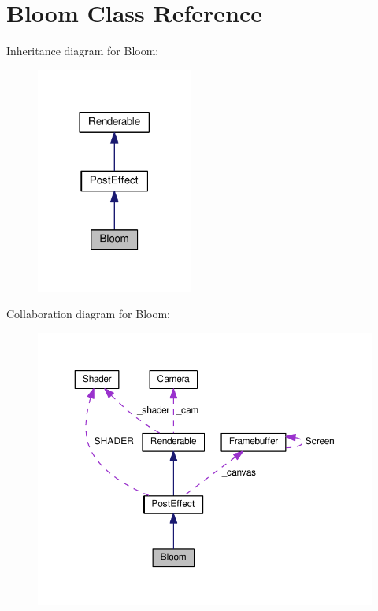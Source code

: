 \hypertarget{class_bloom}{}\section{Bloom Class Reference}
\label{class_bloom}


Inheritance diagram for Bloom\+:\nopagebreak
\begin{figure}[H]
\begin{center}
\leavevmode
\includegraphics[width=146pt]{class_bloom__inherit__graph}
\end{center}
\end{figure}


Collaboration diagram for Bloom\+:\nopagebreak
\begin{figure}[H]
\begin{center}
\leavevmode
\includegraphics[width=350pt]{class_bloom__coll__graph}
\end{center}
\end{figure}

